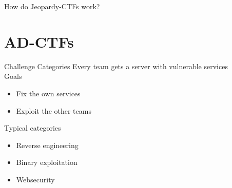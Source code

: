 \documentclass[12pt]{beamer}
\begin{document}
\begin{frame}{How do Jeopardy-CTFs work?}
\end{frame}


\section{AD-CTFs}
\begin{frame}{Challenge Categories}
    Every team gets a server with vulnerable services \\
    Goals
    \begin{itemize}
        \item Fix the own services
        \item Exploit the other teams
    \end{itemize}

    Typical categories
    \begin{itemize}
        \item Reverse engineering
        \item Binary exploitation
        \item Websecurity
    \end{itemize}
\end{frame}
\end{document}
